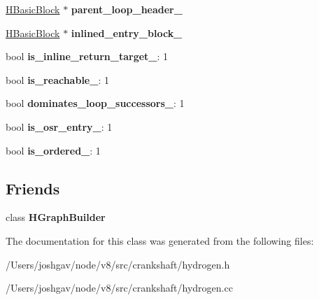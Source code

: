\begin{DoxyCompactItemize}
\item 
\hyperlink{classv8_1_1internal_1_1_h_basic_block}{H\+Basic\+Block} $\ast$ {\bfseries parent\+\_\+loop\+\_\+header\+\_\+}\hypertarget{classv8_1_1internal_1_1_h_basic_block_a2b823b8f517530f32f96241888cf81a1}{}\label{classv8_1_1internal_1_1_h_basic_block_a2b823b8f517530f32f96241888cf81a1}

\item 
\hyperlink{classv8_1_1internal_1_1_h_basic_block}{H\+Basic\+Block} $\ast$ {\bfseries inlined\+\_\+entry\+\_\+block\+\_\+}\hypertarget{classv8_1_1internal_1_1_h_basic_block_a4ae147bc2edc69fd792e84e31c2ef848}{}\label{classv8_1_1internal_1_1_h_basic_block_a4ae147bc2edc69fd792e84e31c2ef848}

\item 
bool {\bfseries is\+\_\+inline\+\_\+return\+\_\+target\+\_\+}\+: 1\hypertarget{classv8_1_1internal_1_1_h_basic_block_a5e0eac96b0440fb91a163a45b145458c}{}\label{classv8_1_1internal_1_1_h_basic_block_a5e0eac96b0440fb91a163a45b145458c}

\item 
bool {\bfseries is\+\_\+reachable\+\_\+}\+: 1\hypertarget{classv8_1_1internal_1_1_h_basic_block_aad996e069cc255e04233e18ff0003d55}{}\label{classv8_1_1internal_1_1_h_basic_block_aad996e069cc255e04233e18ff0003d55}

\item 
bool {\bfseries dominates\+\_\+loop\+\_\+successors\+\_\+}\+: 1\hypertarget{classv8_1_1internal_1_1_h_basic_block_a4628efd1e712bcb70b9a45e7de448314}{}\label{classv8_1_1internal_1_1_h_basic_block_a4628efd1e712bcb70b9a45e7de448314}

\item 
bool {\bfseries is\+\_\+osr\+\_\+entry\+\_\+}\+: 1\hypertarget{classv8_1_1internal_1_1_h_basic_block_a8559ab7f07992e8f7790051399470606}{}\label{classv8_1_1internal_1_1_h_basic_block_a8559ab7f07992e8f7790051399470606}

\item 
bool {\bfseries is\+\_\+ordered\+\_\+}\+: 1\hypertarget{classv8_1_1internal_1_1_h_basic_block_a839d002f1b8efe530647550962b640b1}{}\label{classv8_1_1internal_1_1_h_basic_block_a839d002f1b8efe530647550962b640b1}

\end{DoxyCompactItemize}
\subsection*{Friends}
\begin{DoxyCompactItemize}
\item 
class {\bfseries H\+Graph\+Builder}\hypertarget{classv8_1_1internal_1_1_h_basic_block_a591bb60c51048ff225acce68488b9fa4}{}\label{classv8_1_1internal_1_1_h_basic_block_a591bb60c51048ff225acce68488b9fa4}

\end{DoxyCompactItemize}


The documentation for this class was generated from the following files\+:\begin{DoxyCompactItemize}
\item 
/\+Users/joshgav/node/v8/src/crankshaft/hydrogen.\+h\item 
/\+Users/joshgav/node/v8/src/crankshaft/hydrogen.\+cc\end{DoxyCompactItemize}
